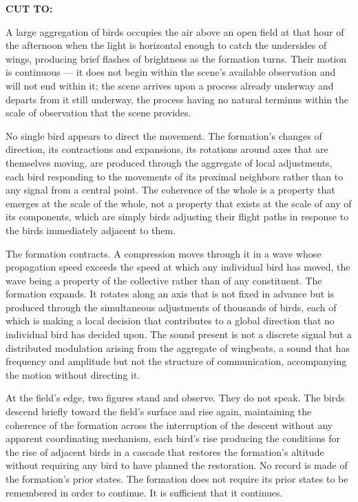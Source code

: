 \documentclass[12pt, oneside]{article}
\newcommand{\sceneheading}[1]{%
  \vspace{1.8em}%
  \noindent{\bfseries\large\MakeUppercase{#1}}%
  \vspace{0.6em}%
  \par\noindent{\color{rulecolor}\rule{\linewidth}{0.3pt}}%
  \vspace{0.5em}\par%
}
\newenvironment{action}{%
  \vspace{0.6em}%
  \noindent\ignorespaces%
}{%
  \par\vspace{0.6em}%
}
\newcommand{\transition}[1]{%
  \vspace{0.8em}%
  \begin{flushright}%
    \bfseries #1%
  \end{flushright}%
  \vspace{0.5em}%
}
\begin{document}
\transition{CUT TO:}

\sceneheading{EXT. Open Field — Late Afternoon}

\begin{action}
A large aggregation of birds occupies the air above an open field at that hour of the afternoon when the light is horizontal enough to catch the undersides of wings, producing brief flashes of brightness as the formation turns. Their motion is continuous --- it does not begin within the scene's available observation and will not end within it; the scene arrives upon a process already underway and departs from it still underway, the process having no natural terminus within the scale of observation that the scene provides.

No single bird appears to direct the movement. The formation's changes of direction, its contractions and expansions, its rotations around axes that are themselves moving, are produced through the aggregate of local adjustments, each bird responding to the movements of its proximal neighbors rather than to any signal from a central point. The coherence of the whole is a property that emerges at the scale of the whole, not a property that exists at the scale of any of its components, which are simply birds adjusting their flight paths in response to the birds immediately adjacent to them.
\end{action}

\begin{action}
The formation contracts. A compression moves through it in a wave whose propagation speed exceeds the speed at which any individual bird has moved, the wave being a property of the collective rather than of any constituent. The formation expands. It rotates along an axis that is not fixed in advance but is produced through the simultaneous adjustments of thousands of birds, each of which is making a local decision that contributes to a global direction that no individual bird has decided upon. The sound present is not a discrete signal but a distributed modulation arising from the aggregate of wingbeats, a sound that has frequency and amplitude but not the structure of communication, accompanying the motion without directing it.

At the field's edge, two figures stand and observe. They do not speak. The birds descend briefly toward the field's surface and rise again, maintaining the coherence of the formation across the interruption of the descent without any apparent coordinating mechanism, each bird's rise producing the conditions for the rise of adjacent birds in a cascade that restores the formation's altitude without requiring any bird to have planned the restoration. No record is made of the formation's prior states. The formation does not require its prior states to be remembered in order to continue. It is sufficient that it continues.
\end{action}
\end{document}
